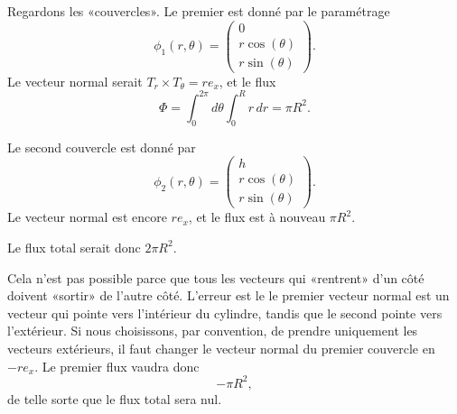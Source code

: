 \begin{example}
	Regardons les «couvercles». Le premier est donné par le paramétrage
	\begin{equation}
		\phi_1(r,\theta)=\begin{pmatrix}
			0             \\
			r\cos(\theta) \\
			r\sin(\theta)
		\end{pmatrix}.
	\end{equation}
	Le vecteur normal serait \( T_r\times T_{\theta}=re_x\), et le flux
	\begin{equation}
		\Phi=\int_0^{2\pi}d\theta\int_0^Rr\,dr=\pi R^2.
	\end{equation}

	Le second couvercle est donné par
	\begin{equation}
		\phi_2(r,\theta)=\begin{pmatrix}
			h             \\
			r\cos(\theta) \\
			r\sin(\theta)
		\end{pmatrix}.
	\end{equation}
	Le vecteur normal est encore \( re_x\), et le flux est à nouveau \( \pi R^2\).

	Le flux total serait donc \( 2\pi R^2\).

	Cela n'est pas possible parce que tous les vecteurs qui «rentrent» d'un côté doivent «sortir» de l'autre côté. L'erreur est le le premier vecteur normal est un vecteur qui pointe vers l'intérieur du cylindre, tandis que le second pointe vers l'extérieur. Si nous choisissons, par convention, de prendre uniquement les vecteurs extérieurs, il faut changer le vecteur normal du premier couvercle en \( -re_x\). Le premier flux vaudra donc
	\begin{equation}
		-\pi R^2,
	\end{equation}
	de telle sorte que le flux total sera nul.
\end{example}

